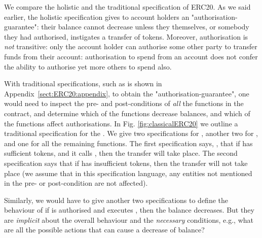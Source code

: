 We  compare the holistic and the traditional specification of ERC20.
As we said earlier,  the holistic specification gives to account holders an
 "authorisation-guarantee": their balance cannot decrease unless they
 themselves, or somebody they had authorised, instigates a transfer of
 tokens. Moreover, authorisation is {\em not} transitive: only the
 account holder can authorise some other party to transfer funds from
 their account: authorisation to spend from an account does not confer
 the ability to authorise yet more others to spend also.
 
 With traditional  specifications, such as is shown in Appendix~\ref{sect:ERC20:appendix}, to obtain the "authorisation-guarantee", 
one would need to inspect the pre- and post-conditions of {\em all} the functions
in the contract, and determine which of the functions decrease balances, and which of the functions 
 affect authorisations.
In Fig. \ref{fig:classicalERC20} we outline a traditional specification for the .
We give two specifications for , another two for , and one for all 
the remaining functions. The  first specification says, \eg, that if  
  has sufficient tokens, and it calls , then the transfer will take place.  
The second specification says that  if  has insufficient tokens, then 
the transfer will not take place (we assume that in this
specification language, any entities not mentioned in the pre- or post-condition 
are not affected).
 
 Similarly, we would have to give another two specifications to define the behaviour of 
if  is authorised and executes , then   the balance decreases. 
But they are {\em implicit} about the overall behaviour and the   {\em necessary} conditions,
e.g., what are all the possible actions that can cause a decrease of balance?


